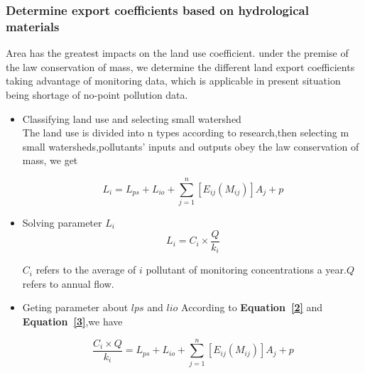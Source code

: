 \documentclass[12pt,a4paper]{article}
\newcommand*{\equref}[1]{{\bf Equation~\eqref{#1}}}
\begin{document}
\subsubsection{Determine export coefficients based on hydrological materials}
Area has the greatest impacts on the land use coefficient. under the premise of the law conservation of mass, we determine the different land export coefficients taking advantage of monitoring data, which is applicable in present situation being shortage of no-point pollution data.\par

\begin{itemize}
    \item  Classifying land use and selecting small watershed \\
    The land use is divided into n types according to research,then selecting m small watersheds,pollutants' inputs and outputs obey the law conservation of mass, we get   
    
    \begin{equation}L_i=L_{ps}+L_{io}+\sum_{j=1}^n[E_{ij}(M_{ij})]A_j+p\end{equation}
    
   \newpage
    \item   Solving parameter $L_i$ \\
    
    \begin{equation}L_i=C_i\times\frac{Q}{k_i}\end{equation}
    
    $C_i$ refers to the average of $i$ pollutant of monitoring concentrations a year.$Q$ refers to annual flow.
    \item  Geting parameter about $lps$ and $lio$
    According to \equref{2} and \equref{3},we have
    
    \begin{equation}\frac{C_i\times Q}{k_i}=L_{ps}+L_{io}+\sum_{j=1}^n[E_{ij}(M_{ij})]A_j+p\end{equation}
    

\end{itemize}
\end{document}
